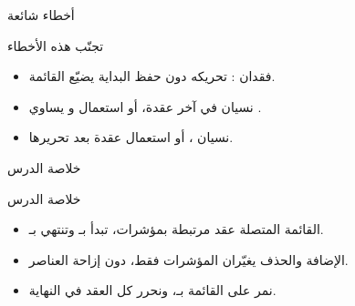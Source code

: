 \documentclass[aspectratio=169, 11pt, t, xcolor={table}]{beamer}
\begin{document}
\begin{frame}{أخطاء شائعة}
    \begin{obox}{\faExclamationTriangle\quad تجنّب هذه الأخطاء}
        \begin{itemize}
            \item فقدان : تحريكه دون حفظ البداية يضيّع القائمة.
            \item نسيان  في آخر عقدة، أو استعمال  و يساوي .
            \item نسيان ، أو استعمال عقدة بعد تحريرها.
        \end{itemize}
    \end{obox}
\end{frame}

\begin{frame}{خلاصة الدرس}
    \begin{tbox}{\faCheckCircle\quad خلاصة الدرس}
        \begin{itemize}
            \item القائمة المتصلة عقد مرتبطة بمؤشرات، تبدأ بـ وتنتهي بـ.
            \item الإضافة والحذف يغيّران المؤشرات فقط، دون إزاحة العناصر.
            \item نمر على القائمة بـ، ونحرر كل العقد في النهاية.
        \end{itemize}
    \end{tbox}
\end{frame}
\end{document}
